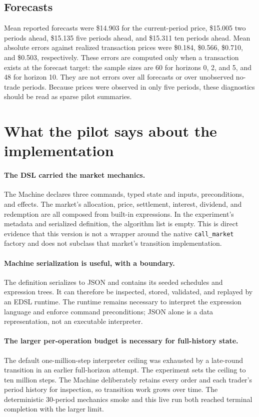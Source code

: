 \documentclass[11pt]{article}
\newcommand{\code}[1]{\texttt{\small #1}}
\begin{document}
\subsection{Forecasts}
Mean reported forecasts were \$14.903 for the current-period price, \$15.005
two periods ahead, \$15.135 five periods ahead, and \$15.311 ten periods ahead.
Mean absolute errors against realized transaction prices were \$0.184,
\$0.566, \$0.710, and \$0.503, respectively. These errors are computed only
when a transaction exists at the forecast target: the sample sizes are 60 for
horizons 0, 2, and 5, and 48 for horizon 10. They are not errors over all
forecasts or over unobserved no-trade periods. Because prices were observed in
only five periods, these diagnostics should be read as sparse pilot summaries.

\section{What the pilot says about the implementation}
\paragraph{The DSL carried the market mechanics.} The Machine declares three
commands, typed state and inputs, preconditions, and effects. The market's
allocation, price, settlement, interest, dividend, and redemption are all
composed from built-in expressions. In the experiment's metadata and serialized
definition, the algorithm list is empty. This is direct evidence that this
version is not a wrapper around the native \code{call\_market} factory and does
not subclass that market's transition implementation.

\paragraph{Machine serialization is useful, with a boundary.} The definition
serializes to JSON and contains its seeded schedules and expression trees. It
can therefore be inspected, stored, validated, and replayed by an EDSL runtime.
The runtime remains necessary to interpret the expression language and enforce
command preconditions; JSON alone is a data representation, not an executable
interpreter.

\paragraph{The larger per-operation budget is necessary for full-history state.}
The default one-million-step interpreter ceiling was exhausted by a late-round
transition in an earlier full-horizon attempt. The experiment sets the ceiling
to ten million steps. The Machine deliberately retains every order and each
trader's period history for inspection, so transition work grows over time.
The deterministic 30-period mechanics smoke and this live run both reached
terminal completion with the larger limit.
\end{document}
